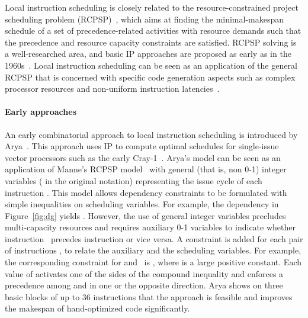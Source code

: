 \documentclass[acmsmall,authorversion,nonacm]{acmart}
\newcommand{\var}[2]{}
\begin{document}
Local instruction scheduling is closely related to the
resource-constrained project scheduling problem
(RCPSP)~\cite{Artigues2008}, which aims at finding the
minimal-makespan schedule of a set of precedence-related activities
with resource demands such that the precedence and resource capacity
constraints are satisfied.
RCPSP solving is a well-researched area, and basic IP approaches are
proposed as early as in the
1960s~\cite{Bowman1959,Wagner1959,Manne1960,Pritsker1969}.
Local instruction scheduling can be seen as an application of the
general RCPSP that is concerned with specific code generation aspects
such as complex processor resources and non-uniform instruction
latencies~\cite{DeDinechin2004}.

\paragraph{Early approaches}

An early combinatorial approach to local instruction scheduling is
introduced by Arya~\cite{Arya1985}.
This approach uses IP to compute optimal schedules for single-issue
vector processors such as the early Cray-1~\cite{Russell1978}.
Arya's model can be seen as an application of Manne's RCPSP
model~\cite{Manne1960} with general (that is, non 0-1) integer
variables \var{s}{i} ( in the original notation) representing the
issue cycle of each instruction .
This model allows dependency constraints to be formulated with simple
inequalities on scheduling variables.
For example, the dependency  in
Figure~\ref{fig:dg} yields .
However, the use of general integer variables precludes multi-capacity
resources and requires auxiliary 0-1 variables \var{p}{i,j} to
indicate whether instruction~ precedes instruction  or vice
versa.
A constraint is added for each pair of instructions ,  to relate
the auxiliary and the scheduling variables.
For example, the corresponding constraint for 
and~ is , where  is a large positive
constant.
Each value of  activates one
of the sides of the compound inequality and enforces a precedence
among  and  in one or the opposite
direction.
Arya shows on three basic blocks of up to 36 instructions that the
approach is feasible and improves the makespan of hand-optimized code
significantly.
\end{document}
